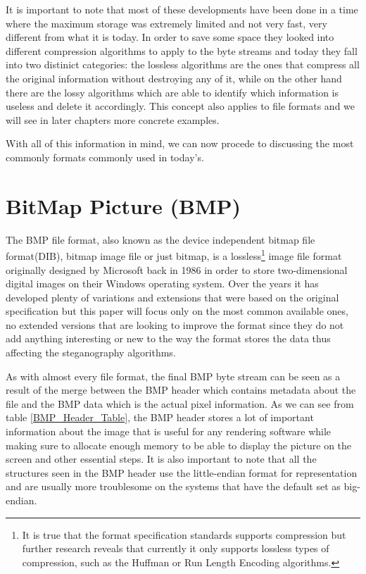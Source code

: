 \begin{multicols}{2}
It is important to note that most of these developments have been done in a time where the maximum storage was extremely limited and not very fast, very different from what it is today. In order to save some space they looked into different compression algorithms to apply to the byte streams and today they fall into two distinict categories: the lossless algorithms are the ones that compress all the original information without destroying any of it, while on the other hand there are the lossy algorithms which are able to identify which information is useless and delete it accordingly. This concept also applies to file formats and we will see in later chapters more concrete examples. 

With all of this information in mind, we can now procede to discussing the most commonly formats commonly used in today's.

\section{BitMap Picture (BMP)} \label{BMP_Explained_Chapter}

The BMP file format, also known as the device independent bitmap file format(DIB), bitmap image file or just bitmap, is a lossless\footnote{It is true that the format specification standards supports compression but further research reveals that currently it only supports lossless types of compression, such as the Huffman or Run Length Encoding algorithms.} image file format originally designed by Microsoft back in 1986 in order to store two-dimensional digital images on their Windows operating system. Over the years it has developed plenty of variations and extensions that were based on the original specification but this paper will focus only on the most common available ones, no extended versions that are looking to improve the format since they do not add anything interesting or new to the way the format stores the data thus affecting the steganography algorithms.

As with almost every file format, the final BMP byte stream can be seen as a result of the merge between the BMP header which contains metadata about the file and the BMP data which is the actual pixel information. As we can see from table \ref{BMP_Header_Table}, the BMP header stores a lot of important information about the image that is useful for any rendering software while making sure to allocate enough memory to be able to display the picture on the screen and other essential steps. It is also important to note that all the structures seen in the BMP header use the little-endian format for representation and are usually more troublesome on the systems that have the default set as big-endian.
\end{multicols}

